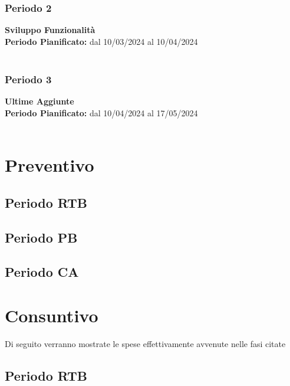 \documentclass[5pt]{article}
\begin{document}
\subsubsection{Periodo 2}
\textbf{Sviluppo Funzionalità} \\
\textbf{Periodo Pianificato:} dal 10/03/2024 al 10/04/2024 \\\\


\subsubsection{Periodo 3}
\textbf{Ultime Aggiunte} \\
\textbf{Periodo Pianificato:} dal 10/04/2024 al 17/05/2024 \\\\




\section{Preventivo}
\subsection{Periodo RTB}
\subsection{Periodo PB}
\subsection{Periodo CA}

\section{Consuntivo}
Di seguito verranno mostrate le spese effettivamente avvenute nelle fasi citate
\subsection{Periodo RTB}
\end{document}
